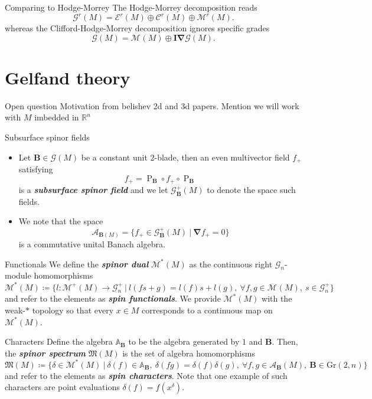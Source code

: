 \documentclass[aspectratio=169,handout]{beamer}
\newcommand\boldgreen[1]{\textcolor{lighter_csu_green}{\emph{\textbf{#1}}}}
\newcommand{\R}{\mathbb{R}}
\newcommand{\algebra}{\mathcal{A}}
\newcommand{\grad}{\boldsymbol{\nabla}}
\newcommand{\G}{\mathcal{G}}
\newcommand{\characters}{\mathfrak{M}}
\newcommand{\dualmonogenics}{\mathcal{M}^*}
\newcommand{\Grassmannian}[2]{\textrm{Gr}(#1,#2)}
\newcommand{\projection}{\operatorname{P}}
\newcommand{\blade}[1]{\boldsymbol{#1}}
\newcommand{\pseudoscalar}{\blade{I}}
\newcommand{\monogenicfields}[1]{\mathcal{M}^{#1}(M)}
\newcommand{\bivector}{\blade{B}}
\begin{document}
\begin{frame}{Comparing to Hodge-Morrey}
\vfill
The Hodge-Morrey decomposition reads
\[
\G^r(M) = \mathcal{E}^r(M) \oplus \mathcal{C}^r(M) \oplus \mathcal{M}^r(M).
\]
whereas the Clifford-Hodge-Morrey decomposition ignores specific grades
\[
\G(M) = \monogenicfields{} \oplus \pseudoscalar \grad \G(M).
\]
\vfill
\end{frame}

\section{Gelfand theory}

\begin{frame}{Open question}
Motivation from belishev 2d and 3d papers. Mention we will work with $M$ imbedded in $\R^n$
\end{frame}

\begin{frame}{Subsurface spinor fields}
\vfill
\begin{itemize}
\item Let $\bivector \in \G(M)$ be a constant unit $2$-blade, then an even multivector field $f_+$ satisfying
\[
f_+ = \projection_{\bivector} \circ f_+ \circ \projection_{\bivector}
\]
is a \boldgreen{subsurface spinor field} and we let $\G_{\bivector}^+(M)$ to denote the space such fields.

\item We note that the space 
\[
\algebra_{\bivector(M)} = \{ f_+ \in \G_{\bivector}^+(M) ~\vert~ \grad f_+ = 0 \}
\]
is a commutative unital Banach algebra.
\end{itemize}
\vfill
\end{frame}

\begin{frame}{Functionals}
\vfill
We define the \boldgreen{spinor dual} $\dualmonogenics(M)$ as the continuous right $\G_n$-module homomorphisms
\[
\dualmonogenics(M) \coloneqq \{ l \colon \monogenicfields{+} \to \G_n^+ ~\vert~ l(fs+g)=l(f)s+l(g), ~\forall f,g\in \monogenicfields{}, ~s \in \G_n^+\}
\]
and refer to the elements as \boldgreen{spin functionals}. We provide $\dualmonogenics(M)$ with the weak-$\ast$ topology so that every $x\in M$ corresponds to a continuous map on $\dualmonogenics(M)$.
\vfill
\end{frame}

\begin{frame}{Characters}
\vfill
Define the algebra $\mathbb{A}_{\bivector}$ to be the algebra generated by $1$ and $\bivector$. Then, the \boldgreen{spinor spectrum} $\characters(M)$ is the set of algebra homomorphisms
\[
\characters(M) \coloneqq \{ \delta \in \dualmonogenics(M) ~\vert~ \delta(f)\in\mathbb{A}_{\bivector},~ \delta(fg) = \delta(f)\delta(g),~\forall f,g \in \algebra_{\bivector}(M),~ \bivector \in \Grassmannian{2}{n} \}
\]
and refer to the elements as \boldgreen{spin characters}. Note that one example of such characters are point evaluations $\delta(f)=f(x^\delta)$.
\vfill
\end{frame}
\end{document}
